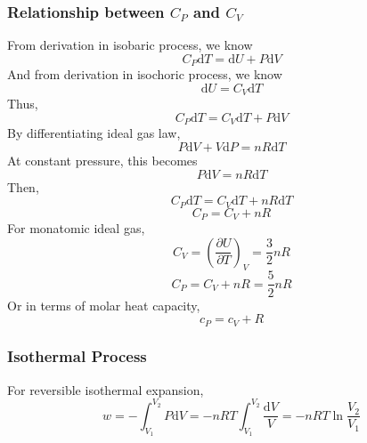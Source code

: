 \documentclass[letterpaper]{article}
\newcommand{\diff}{\mathrm{d}}
\begin{document}
\subsubsection*{Relationship between $C_P$ and $C_V$}
From derivation in isobaric process, we know
\begin{equation*}
    C_P\diff T=\diff U+P\diff V
\end{equation*}
And from derivation in isochoric process, we know
\begin{equation*}
    \diff U=C_V\diff T
\end{equation*}
Thus,
\begin{equation*}
    C_P\diff T=C_V\diff T+P\diff V
\end{equation*}
By differentiating ideal gas law,
\begin{equation*}
    P\diff V+V\diff P=nR\diff T
\end{equation*}
At constant pressure, this becomes
\begin{equation*}
    P\diff V=nR\diff T
\end{equation*}
Then,
\begin{equation*}
    C_P\diff T=C_V\diff T+nR\diff T
\end{equation*}
\begin{equation*}
    \boxed{C_P=C_V+nR}
\end{equation*}
For monatomic ideal gas,
\begin{equation*}
    C_V=(\frac{\partial U}{\partial T})_V=\frac{3}{2}nR
\end{equation*}
\begin{equation*}
    C_P=C_V+nR=\frac{5}{2}nR
\end{equation*}
Or in terms of molar heat capacity,
\begin{equation*}
    c_P=c_V+R
\end{equation*}
\subsubsection*{Isothermal Process}
For reversible isothermal expansion,
\begin{equation*}
    w=-\int_{V_1}^{V_2}P\diff V=-nRT\int_{V_1}^{V_2}\frac{\diff V}{V}=-nRT\ln\frac{V_2}{V_1}
\end{equation*}
\end{document}
